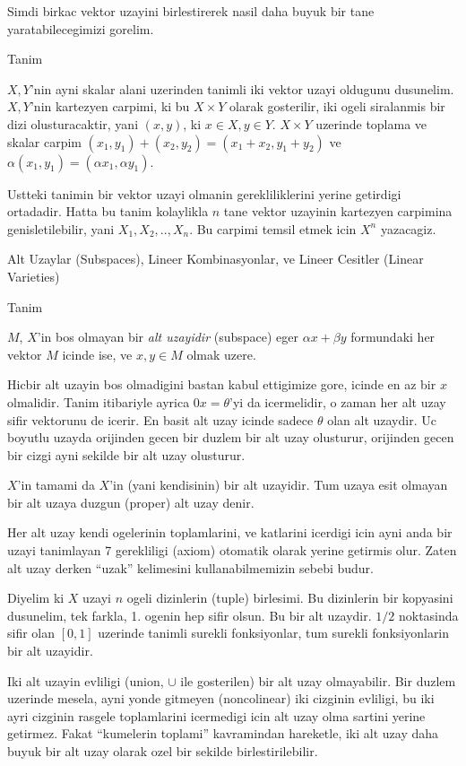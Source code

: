 \documentclass[12pt,fleqn]{article}
\begin{document}
Simdi birkac vektor uzayini birlestirerek nasil daha buyuk bir tane
yaratabilecegimizi gorelim. 

Tanim

$X,Y$'nin ayni skalar alani uzerinden tanimli iki vektor uzayi oldugunu
dusunelim. $X,Y$'nin kartezyen carpimi, ki bu $X \times Y$ olarak
gosterilir, iki ogeli siralanmis bir dizi olusturacaktir, 
yani $(x,y)$, ki $ x \in X, y \in Y$. $X \times Y$ uzerinde toplama ve
skalar carpim $(x_1,y_1) + (x_2,y_2) = (x_1+x_2, y_1+y_2)$ ve
$\alpha(x_1,y_1) = (\alpha x_1,\alpha y_1)$. 

Ustteki tanimin bir vektor uzayi olmanin gerekliliklerini yerine getirdigi
ortadadir. Hatta bu tanim kolaylikla $n$ tane vektor uzayinin kartezyen
carpimina genisletilebilir, yani $X_1,X_2,..,X_n$. Bu carpimi temsil etmek
icin $X^n$ yazacagiz. 

Alt Uzaylar (Subspaces), Lineer Kombinasyonlar, ve Lineer Cesitler (Linear Varieties) 

Tanim 

$M$, $X$'in bos olmayan bir {\em alt uzayidir} (subspace) eger $\alpha x + \beta y$
formundaki her vektor $M$ icinde ise, ve $x,y \in M$ olmak uzere. 

Hicbir alt uzayin bos olmadigini bastan kabul ettigimize gore, icinde en az
bir $x$ olmalidir. Tanim itibariyle ayrica  $0 x = \theta$'yi da
icermelidir, o zaman her alt uzay sifir vektorunu de icerir. En basit alt
uzay icinde sadece $\theta$ olan alt uzaydir. Uc boyutlu uzayda orijinden
gecen bir duzlem bir alt uzay olusturur, orijinden gecen bir cizgi ayni
sekilde bir alt uzay olusturur. 

$X$'in tamami da $X$'in (yani kendisinin) bir alt uzayidir. Tum uzaya esit
olmayan bir alt uzaya duzgun (proper) alt uzay denir. 

Her alt uzay kendi ogelerinin toplamlarini, ve katlarini icerdigi icin ayni
anda bir uzayi tanimlayan 7 gerekliligi (axiom) otomatik olarak yerine
getirmis olur. Zaten alt uzay derken ``uzak'' kelimesini kullanabilmemizin
sebebi budur. 

Diyelim ki $X$ uzayi $n$ ogeli dizinlerin (tuple) birlesimi. Bu dizinlerin
bir kopyasini dusunelim, tek farkla, 1. ogenin hep sifir olsun. Bu bir alt
uzaydir. $1/2$ noktasinda sifir olan $[0,1]$ uzerinde tanimli surekli
fonksiyonlar, tum surekli fonksiyonlarin bir alt uzayidir. 

Iki alt uzayin evliligi (union, $\cup$ ile gosterilen) bir alt uzay
olmayabilir. Bir duzlem uzerinde mesela, ayni yonde gitmeyen (noncolinear)
iki cizginin evliligi, bu iki ayri cizginin rasgele toplamlarini icermedigi
icin alt uzay olma sartini yerine getirmez. Fakat ``kumelerin toplami''
kavramindan hareketle, iki alt uzay daha buyuk bir alt uzay olarak ozel bir
sekilde birlestirilebilir.
\end{document}
